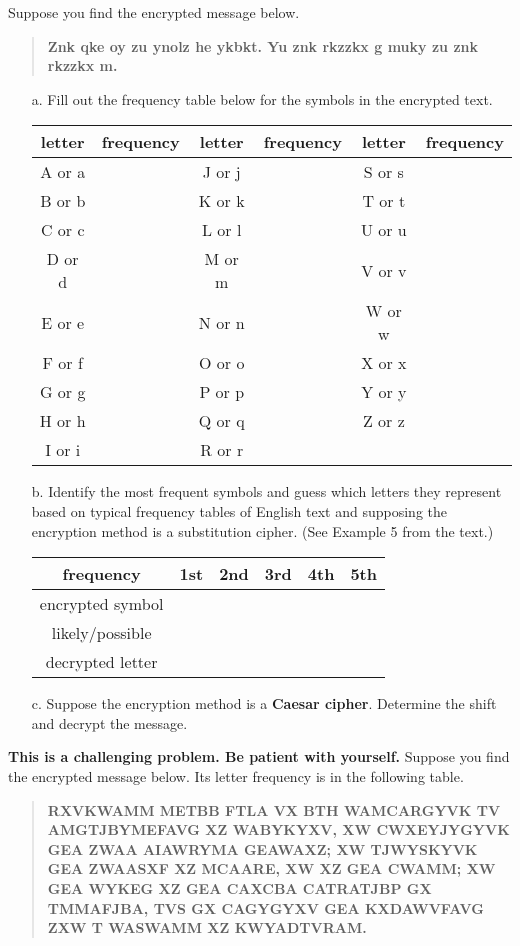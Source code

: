 \documentclass[11pt, oneside]{article}   	%
\begin{document}
\vfill
{} Suppose you find the encrypted message below. 
\begin{quote} \textbf{Znk qke oy zu ynolz he ykbkt. Yu znk rkzzkx g muky zu znk rkzzkx m.} \end{quote}
	\begin{enumerate}
	\item[a.] Fill out the frequency table below for the symbols in the encrypted text.\\
	\begin{tabular}{c|c||c|c||c|c}
	letter&frequency&letter&frequency&letter&frequency\\
	\hline \hline
	A or a&&J or j&&S or s&\\
	\hline
	B or b&&K or k&&T or t&\\
	\hline
	C or c&&L or l&&U or u&\\
	\hline
	D or d&&M or m&&V or v&\\
	\hline
	E or e&&N or n&&W or w&\\
	\hline
	F or f&&O or o&&X or x&\\
	\hline
	G or g&&P or p&&Y or y&\\
	\hline
	H or h&&Q or q&&Z or z&\\
	\hline
	I or i&&R or r&&&\\
	\hline
	\end{tabular}
	\item[b.] Identify the most frequent symbols and guess which letters they represent based on typical frequency tables of English text and supposing the encryption method is a substitution cipher. (See Example 5 from the text.) \\
	\begin{tabular}{c||c|c|c|c|c}
	frequency&1st&2nd&3rd&4th&5th\\
	\hline
	encrypted symbol&&&&&\\
	\hline
	likely/possible&&&&&\\
	decrypted letter&&&&&\\
	\end{tabular}
	\item[c.] Suppose the encryption method is a \textbf{Caesar cipher}. Determine the shift and decrypt the message.
	
	\end{enumerate}
 \textbf{This is a challenging problem. Be patient with yourself.} Suppose you find the encrypted message below. Its letter frequency is in the following table. 
\begin{quote} \textbf{RXVKWAMM METBB FTLA VX BTH WAMCARGYVK TV AMGTJBYMEFAVG XZ WABYKYXV, XW CWXEYJYGYVK GEA ZWAA AIAWRYMA GEAWAXZ; XW TJWYSKYVK GEA ZWAASXF XZ MCAARE, XW XZ GEA CWAMM; XW GEA WYKEG XZ GEA CAXCBA CATRATJBP GX TMMAFJBA, TVS GX CAGYGYXV GEA KXDAWVFAVG ZXW T WASWAMM XZ KWYADTVRAM.} \end{quote}
	 
\end{document}
